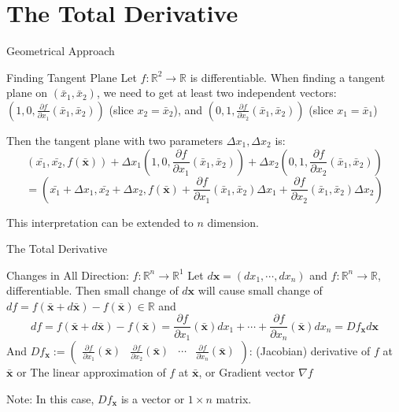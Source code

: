 \documentclass[final]{beamer}
\newcommand{\bb}{\mathbb}
\newcommand{\bd}{\mathbf}
\newcommand{\p}{\partial}
\begin{document}
\section{The Total Derivative} %
\label{sec:the_total_derivative}

\begin{frame}[t]{Geometrical Approach}
	\begin{block}{Finding Tangent Plane}
		Let $f:\bb{R}^2\rightarrow \bb{R}$ is differentiable. When finding a tangent plane on $(\bar x_1, \bar x_2)$, we need to get at least two independent vectors: $\left(1,0,\frac{\p f}{\p x_1}(\bar x_1, \bar x_2)\right)$ (slice $x_2=\bar x_2$), and $\left(0,1,\frac{\p f}{\p x_2}(\bar x_1, \bar x_2)\right)$ (slice $x_1=\bar x_1$)

		Then the tangent plane with two parameters $\Delta x_1, \Delta x_2$ is:\[
			(\bar {x_1}, \bar{x_2}, f(\bar {\bd x})) + \Delta x_1\left(1,0,\frac{\p f}{\p x_1}(\bar x_1, \bar x_2) \right)+\Delta x_2\left(0,1,\frac{\p f}{\p x_2}(\bar x_1, \bar x_2)\right)
		\]\[
			=\left(\bar{ x_1}+\Delta x_1 , \bar{x_2}+\Delta x_2, f(\bar {\bd x})+ \frac{\p f}{\p x_1}(\bar x_1, \bar x_2)\Delta x_1 + \frac{\p f}{\p x_2}(\bar x_1, \bar x_2)\Delta x_2 \right)
		\]
	\end{block}
	This interpretation can be extended to $n$ dimension.
\end{frame}

\begin{frame}[t]{The Total Derivative}
	\begin{block}
		{Changes in All Direction: $f:\bb{R}^n\rightarrow \bb{R}^1$}
		Let $d \bd x = (d x_1, \cdots, d x_n)$ and $f:\bb{R}^n\rightarrow\bb{R}$, differentiable. Then small change of $d\bd x$ will cause small change of $df=f(\bar{\bd x} + d \bar{\bd x}) - f(\bar{\bd x})\in\bb{R}$ and \[
			df = f(\bar{\bd x} + d \bar{\bd x}) - f(\bar{\bd x}) = \frac{\p f}{\p x_1}(\bar{\bd x})dx_1 + \cdots +\frac{\p f}{\p x_n}(\bar{\bd x})dx_n= Df_{\bd x} d\bd x
		\]
		And $Df_{\bd x}:=\begin{pmatrix}
			\frac{\p f}{\p x_1}(\bar{\bd x}) & \frac{\p f}{\p x_2}(\bar{\bd x}) &\cdots & \frac{\p f}{\p x_n}(\bar{\bd x})
		\end{pmatrix}$: (Jacobian) derivative of $f$ at $\bar{\bd x}$ or The linear approximation of $f$ at $\bar{\bd x}$, or Gradient vector $\nabla f$
	\end{block}
	Note: In this case, $Df_{\bd x}$ is a vector or $1\times n$ matrix.
\end{frame}
\end{document}

